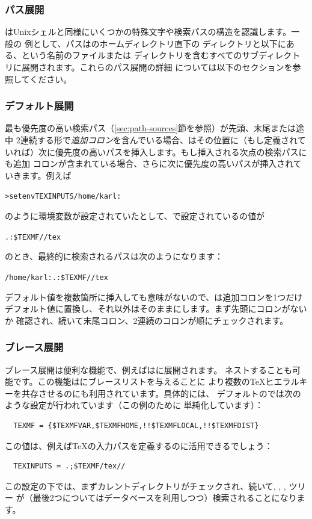 \documentclass[uplatex,dvipdfmx,12pt,tombow]{jsarticle}
\begin{document}
\subsubsection{パス展開}
\label{sec:path-expansion}

\KPS はUnixシェルと同様にいくつかの特殊文字や検索パスの構造を認識します。一般の
例として、パスはのホームディレクトリ直下の
ディレクトリと以下にある、という名前のファイルまたは
ディレクトリを含むすべてのサブディレクトリに展開されます。これらのパス展開の詳細
については以下のセクションを参照してください。

\subsubsection{デフォルト展開}
\label{sec:default-expansion}

最も優先度の高い検索パス（\ref{sec:path-sources}節を参照）が先頭、末尾または途中
2連続する形で\emph{追加コロン}を含んでいる場合、\KPS はその位置に（もし定義されて
いれば）次に優先度の高いパスを挿入します。もし挿入される次点の検索パスにも追加
コロンが含まれている場合、さらに次に優先度の高いパスが挿入されていきます。例えば
%
\begin{alltt}
> setenv TEXINPUTS /home/karl:
\end{alltt}
%
のように環境変数が設定されていたとして、で設定されているの値が
%
\begin{alltt}
  .:\$TEXMF//tex
\end{alltt}
%
のとき、最終的に検索されるパスは次のようになります：
%
\begin{alltt}
  /home/karl:.:\$TEXMF//tex
\end{alltt}
デフォルト値を複数箇所に挿入しても意味がないので、\KPS は追加コロンを1つだけ
デフォルト値に置換し、それ以外はそのままにします。まず先頭にコロンがないか
確認され、続いて末尾コロン、2連続のコロンが順にチェックされます。

\subsubsection{ブレース展開}
\label{sec:brace-expansion}

ブレース展開は便利な機能で、例えばはに展開されます。
ネストすることも可能です。この機能はにブレースリストを与えることに
より複数の\TeX ヒエラルキーを共存させるのにも利用されています。具体的には、
デフォルトのでは次のような設定が行われています（この例のために
単純化しています）：
%
\begin{verbatim}
  TEXMF = {$TEXMFVAR,$TEXMFHOME,!!$TEXMFLOCAL,!!$TEXMFDIST}
\end{verbatim}
%
この値は、例えば\TeX の入力パスを定義するのに活用できるでしょう：
%
\begin{verbatim}
  TEXINPUTS = .;$TEXMF/tex//
\end{verbatim}
%
この設定の下では、まずカレントディレクトリがチェックされ、続いて, , , ツリー
が（最後2つについてはデータベースを利用しつつ）検索されることになります。
\end{document}
